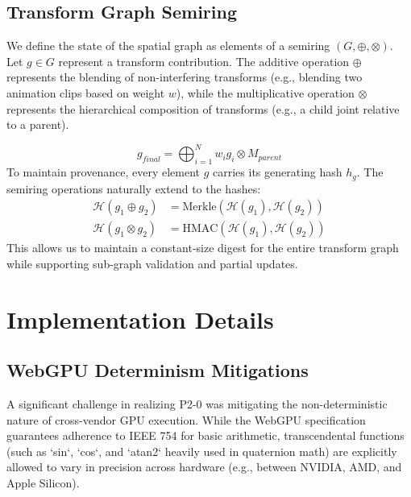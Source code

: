 \documentclass[sigconf,nonacm]{acmart}
\newcommand{\hashfn}{\mathcal{H}}
\newcommand{\tropmult}{\otimes}
\begin{document}
\subsection{Transform Graph Semiring} We define the state of the spatial graph
as elements of a semiring $(G, \oplus, \tropmult)$. Let $g \in G$ represent a
transform contribution. The additive operation $\oplus$ represents the blending
of non-interfering transforms (e.g., blending two animation clips based on
weight $w$), while the multiplicative operation $\tropmult$ represents the
hierarchical composition of transforms (e.g., a child joint relative to a
parent).

\begin{equation}     g_{final} = \bigoplus_{i=1}^N w_i g_i \tropmult M_{parent}
\end{equation} To maintain provenance, every element $g$ carries its generating
hash $h_g$. The semiring operations naturally extend to the hashes:
\begin{align}     \hashfn(g_1 \oplus g_2) &= \text{Merkle}( \hashfn(g_1),
\hashfn(g_2) ) \\     \hashfn(g_1 \tropmult g_2) &= \text{HMAC}(\hashfn(g_1),
\hashfn(g_2)) \end{align} This allows us to maintain a constant-size digest for
the entire transform graph while supporting sub-graph validation and partial
updates.

\section{Implementation Details} \subsection{WebGPU Determinism Mitigations} A
significant challenge in realizing P2-0 was mitigating the non-deterministic
nature of cross-vendor GPU execution. While the WebGPU specification guarantees
adherence to IEEE 754 for basic arithmetic, transcendental functions (such as
`sin`, `cos`, and `atan2` heavily used in quaternion math) are explicitly
allowed to vary in precision across hardware (e.g., between NVIDIA, AMD, and
Apple Silicon).
\end{document}
